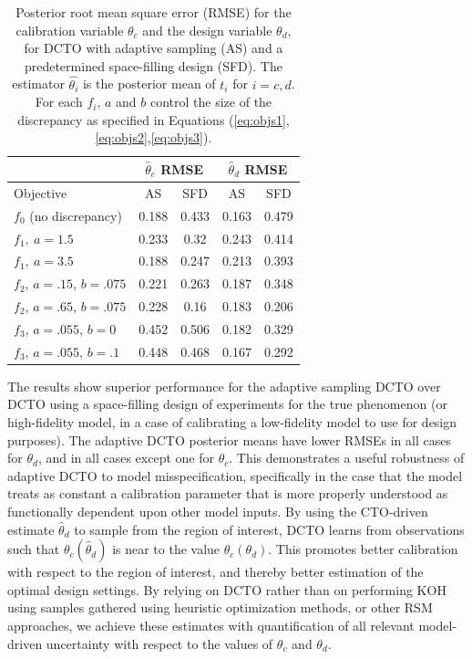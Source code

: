 \documentclass[twocolumn,10pt]{asme2ej}
\begin{document}
%
\begin{table}[]
	\centering
	\begin{tabular}{l|cc|cc}
		&\multicolumn{2}{c|}{$\widehat\theta_c$ RMSE}&
		\multicolumn{2}{c}{$\widehat\theta_d$ RMSE} \\ \hline
		Objective    & AS   & SFD & AS    & SFD   \\ \hline
		$f_0$ (no discrepancy)             & 0.188 & 0.433 & 0.163 & 0.479\\ \hline
		$f_1,\ a=1.5$       & 0.233 & 0.32 & 0.243 & 0.414\\ \hline
		$f_1,\ a=3.5$       & 0.188 & 0.247 & 0.213 & 0.393\\ \hline
		$f_2$, $a=.15$, $b=.075$       & 0.221 & 0.263 & 0.187 & 0.348\\ \hline
		$f_2$, $a=.65$, $b=.075$       & 0.228 & 0.16 & 0.183 & 0.206\\ \hline
		$f_3$, $a=.055$, $b=0$       & 0.452 & 0.506 & 0.182 & 0.329\\ \hline
		$f_3$, $a=.055$, $b=.1$       & 0.448 & 0.468 & 0.167 & 0.292\\ \hline
	\end{tabular}
	\caption{Posterior root mean square error (RMSE) for the calibration variable $\theta_c$ and the design variable $\theta_d$, for DCTO with adaptive sampling (AS) and a predetermined space-filling design (SFD). The estimator $\widehat{\theta_i}$ is the posterior mean of $t_i$ for $i=c,d$. For each $f_i$, $a$ and $b$ control the size of the discrepancy as specified in Equations (\ref{eq:objs1},\ref{eq:objs2},\ref{eq:objs3}).} 
	\label{table:vars_and_rmses}
\end{table}
%

%
The results show superior performance for the adaptive sampling DCTO over DCTO using a space-filling design of experiments for the true phenomenon (or high-fidelity model, in a case of calibrating a low-fidelity model to use for design purposes).
%
The adaptive DCTO posterior means have lower RMSEs in all cases for $\theta_d$, and in all cases except one for $\theta_c$.
%
This demonstrates a useful robustness of adaptive DCTO to model misspecification, specifically in the case that the model treats as constant a calibration parameter that is more properly understood as functionally dependent upon other model inputs.
%
By using the CTO-driven estimate $\widehat\theta_d$ to sample from the region of interest, DCTO learns from observations such that $\theta_c(\widehat\theta_d)$ is near to the value $\theta_c(\theta_d)$.
%
This promotes better calibration with respect to the region of interest, and thereby better estimation of the optimal design settings.
%
By relying on DCTO rather than on performing KOH using samples gathered using heuristic optimization methods, or other RSM approaches, we achieve these estimates with quantification of all relevant model-driven uncertainty with respect to the values of $\theta_c$ and $\theta_d$.
%
\end{document}
